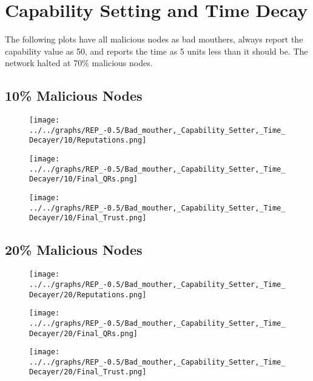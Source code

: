 \section*{Capability Setting and Time Decay}
The following plots have all malicious nodes as bad mouthers, always
report the capability value as 50, and reports the time as 5 units less than
it should be. The network halted at 70\% malicious nodes.
\\
\begin{minipage}[t]{0.49\columnwidth}
\subsection*{10\% Malicious Nodes}
    \begin{figure}[H]
        \centering
        \texttt{[image: ../../graphs/REP\_-0.5/Bad\_mouther,\_Capability\_Setter,\_Time\_Decayer/10/Reputations.png]}
    \end{figure}
    \begin{figure}[H]
        \centering
        \texttt{[image: ../../graphs/REP\_-0.5/Bad\_mouther,\_Capability\_Setter,\_Time\_Decayer/10/Final\_QRs.png]}
    \end{figure}
\end{minipage}
\begin{minipage}[t]{0.49\columnwidth}
    \begin{figure}[H]
        \centering
        \texttt{[image: ../../graphs/REP\_-0.5/Bad\_mouther,\_Capability\_Setter,\_Time\_Decayer/10/Final\_Trust.png]}
    \end{figure}
\end{minipage}

\begin{minipage}[t]{0.49\columnwidth}
\subsection*{20\% Malicious Nodes}
    \begin{figure}[H]
        \centering
        \texttt{[image: ../../graphs/REP\_-0.5/Bad\_mouther,\_Capability\_Setter,\_Time\_Decayer/20/Reputations.png]}
    \end{figure}
    \begin{figure}[H]
        \centering
        \texttt{[image: ../../graphs/REP\_-0.5/Bad\_mouther,\_Capability\_Setter,\_Time\_Decayer/20/Final\_QRs.png]}
    \end{figure}
\end{minipage}
\begin{minipage}[t]{0.49\columnwidth}
    \begin{figure}[H]
        \centering
        \texttt{[image: ../../graphs/REP\_-0.5/Bad\_mouther,\_Capability\_Setter,\_Time\_Decayer/20/Final\_Trust.png]}
    \end{figure}
\end{minipage}

